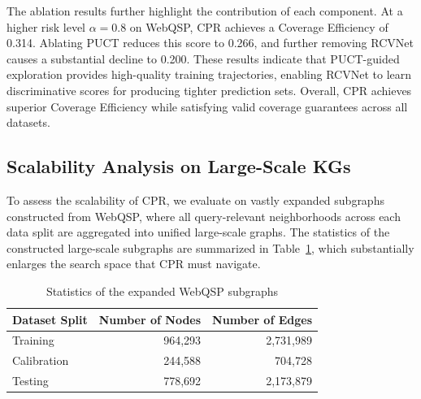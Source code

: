 \documentclass{article}
\newcommand{\jy}[1]{\textcolor{red}{[JY: #1]}}
\theoremstyle{plain}
\theoremstyle{definition}
\theoremstyle{remark}
\begin{document}
The ablation results further highlight the contribution of each component.
At a higher risk level $\alpha=0.8$ on WebQSP, CPR achieves a Coverage Efficiency of 0.314. Ablating PUCT reduces this score to 0.266, and further removing RCVNet causes a substantial decline to 0.200. These results indicate that PUCT-guided exploration provides high-quality training trajectories, enabling RCVNet to learn discriminative scores for producing tighter prediction sets. 
Overall, CPR achieves superior Coverage Efficiency while satisfying valid coverage guarantees across all datasets.

\subsection{Scalability Analysis on Large-Scale KGs}
\label{sec:scalability}

To assess the scalability of CPR, we evaluate on vastly expanded subgraphs constructed from WebQSP, where all query-relevant neighborhoods across each data split are aggregated into unified large-scale graphs. The statistics of the constructed large-scale subgraphs are summarized in Table~\ref{tab:webqsp_expanded_stats}, which substantially enlarges the search space that CPR must navigate.
\begin{table}[h]
\small
\centering
\caption{Statistics of the expanded WebQSP subgraphs}
\label{tab:webqsp_expanded_stats}
\setlength{\tabcolsep}{3mm}
\begin{tabular}{lrr}
\toprule
Dataset Split & Number of Nodes & Number of Edges \\
\midrule
Training      & 964,293         & 2,731,989       \\
Calibration   & 244,588         & 704,728         \\
Testing       & 778,692         & 2,173,879       \\
\bottomrule
\end{tabular}
\end{table}
\vspace{-8pt}
\end{document}
